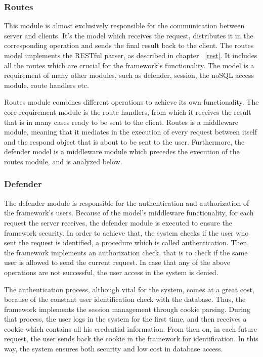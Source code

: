 \subsubsection{Routes}
This module is almost exclusively responsible for the communication between server and clients. It's the model which receives the request, distributes it in the corresponding operation and sends the final result back to the client. The routes model implements the RESTful parser, as described in chapter ~\ref{rest}. It includes all the routes which are crucial for the framework's functionality. The model is a requirement of many other modules, such as defender, session, the noSQL access module, route handlers etc.\par
Routes module combines different operations to achieve its own functionality. The core requirement module is the route handlers, from which it receives the result that is in many cases ready to be sent to the client. Routes is a middleware module, meaning that it mediates in the execution of every request between itself and the respond object that is about to be sent to the user. Furthermore, the defender model is a middleware module which precedes the execution of the routes module, and is analyzed below.

\subsubsection{Defender}
\label{def}
The defender module is responsible for the authentication and authorization of the framework's users. Because of the model's middleware functionality, for each request the server receives, the defender module is executed to ensure the framework security. In order to achieve that, the system checks if the user who sent the request is identified, a procedure which is called authentication. Then, the framework implements an authorization check, that is to check if the same user is allowed to send the current request. In case that any of the above operations are not successful, the user access in the system is denied. \par
	The authentication process, although vital for the system, comes at a great cost, because of the constant user identification check with the database. Thus, the framework implements the session management through cookie parsing. During that process, the user logs in the system for the first time, and then receives a cookie which contains all his credential information. From then on, in each future request, the user sends back the cookie in the framework for identification. In this way, the system ensures both security and low cost in database access.


